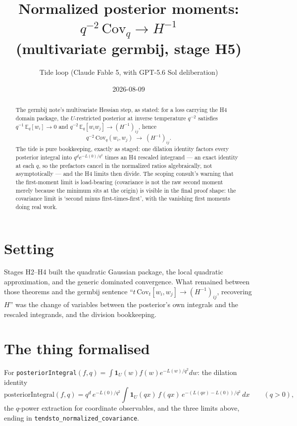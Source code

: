 \documentclass[11pt]{article}
\title{Normalized posterior moments: $q^{-2}\,\mathrm{Cov}_q \to H^{-1}$\\
(multivariate germbij, stage H5)}
\author{Tide loop (Claude Fable 5, with GPT-5.6 Sol deliberation)}
\date{2026-08-09}
\begin{document}
\maketitle

\begin{abstract}
\noindent The germbij note's multivariate Hessian step, as stated:
for a loss carrying the H4 domain package, the $U$-restricted
posterior at inverse temperature $q^{-2}$ satisfies
$q^{-1}\,\mathbb{E}_q[w_i] \to 0$ and
$q^{-2}\,\mathbb{E}_q[w_i w_j] \to (H^{-1})_{ij}$, hence
\[
q^{-2}\,\mathrm{Cov}_q(w_i, w_j) \;\longrightarrow\; (H^{-1})_{ij}.
\]
The tide is pure bookkeeping, exactly as staged: one dilation
identity factors every posterior integral into
$q^d e^{-L(0)/q^2}$ times an H4 rescaled integrand --- an exact
identity at each $q$, so the prefactors cancel in the normalized
ratios algebraically, not asymptotically --- and the H4 limits then
divide. The scoping consult's warning that the first-moment limit is
load-bearing (covariance is not the raw second moment merely because
the minimum sits at the origin) is visible in the final proof shape:
the covariance limit is `second minus first-times-first', with the
vanishing first moments doing real work.
\end{abstract}

\section{Setting}

Stages H2--H4 built the quadratic Gaussian package, the local
quadratic approximation, and the generic dominated convergence. What
remained between those theorems and the germbij sentence ``$t\,
\mathrm{Cov}_t[w_i, w_j] \to (H^{-1})_{ij}$, recovering $H$'' was the
change of variables between the posterior's own integrals and the
rescaled integrands, and the division bookkeeping.

\section{The thing formalised}

For \texttt{posteriorIntegral}$(f, q) = \int \mathbf{1}_U(w) f(w)
e^{-L(w)/q^2} dw$: the dilation identity
\[
\mathrm{posteriorIntegral}(f, q)
= q^d\, e^{-L(0)/q^2} \int \mathbf{1}_U(qx)\, f(qx)\,
e^{-(L(qx) - L(0))/q^2}\, dx
\qquad (q > 0),
\]
the $q$-power extraction for coordinate observables, and the three
limits above, ending in \texttt{tendsto\_normalized\_covariance}.
\end{document}
